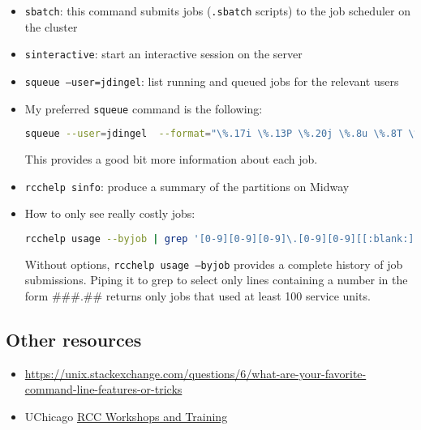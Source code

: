 \begin{itemize}
	\item \texttt{sbatch}: this command submits jobs (\texttt{.sbatch} scripts) to the job scheduler on the cluster
	\item \texttt{sinteractive}: start an interactive session on the server
	\item \texttt{squeue --user=jdingel}: list running and queued jobs for the relevant users
	\item My preferred \texttt{squeue} command is the following:
	\begin{lstlisting}[language=bash]
	squeue --user=jdingel  --format="\%.17i \%.13P \%.20j \%.8u \%.8T \%.9M \%.9l \%.6D \%R" #jdjobs
	\end{lstlisting}
	This provides a good bit more information about each job.
	\item \texttt{rcchelp sinfo}: produce a summary of the partitions on Midway
	\item How to only see really costly jobs: 
	\begin{lstlisting}[language=bash]
	rcchelp usage --byjob | grep '[0-9][0-9][0-9]\.[0-9][0-9][[:blank:]]|'
	\end{lstlisting}
	Without options, \texttt{rcchelp usage --byjob} provides a complete history of job submissions.
	Piping it to grep to select only lines containing a number in the form \#\#\#.\#\# returns only jobs that used at least 100 service units.
\end{itemize}

\subsection{Other resources}

\begin{itemize}
	\item \url{https://unix.stackexchange.com/questions/6/what-are-your-favorite-command-line-features-or-tricks}
	\item UChicago \href{https://rcc.uchicago.edu/support-and-services/workshops-and-training}{RCC Workshops and Training}
\end{itemize}